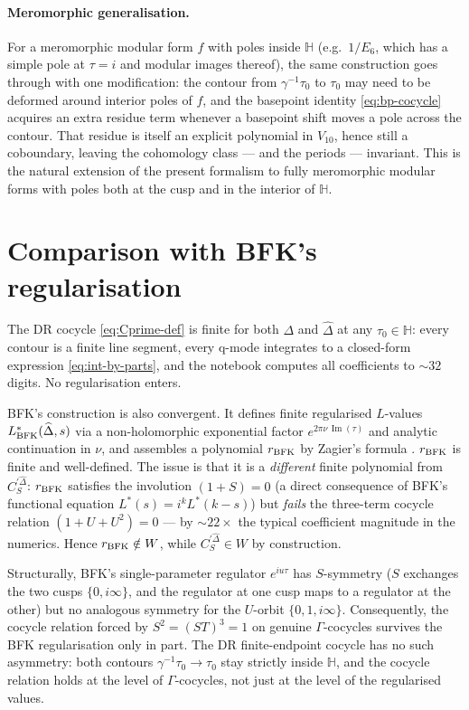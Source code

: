 \documentclass[11pt,letterpaper]{article}
\newcommand{\HH}{\mathbb{H}}
\newcommand{\Dhat}{\widehat{\Delta}}
\DeclareMathOperator{\im}{Im}
\begin{document}
\paragraph{Meromorphic generalisation.}
For a meromorphic modular form $f$ with poles inside $\HH$ (e.g.\ $1/E_6$,
which has a simple pole at $\tau = i$ and modular images thereof), the same
construction goes through with one modification: the contour from
$\gamma^{-1}\tau_0$ to $\tau_0$ may need to be deformed around interior poles
of $f$, and the basepoint identity \eqref{eq:bp-cocycle} acquires an
extra residue term whenever a basepoint shift moves a pole across the contour.
That residue is itself an explicit polynomial in $V_{10}$, hence still a
coboundary, leaving the cohomology class — and the periods — invariant.  This
is the natural extension of the present formalism to fully meromorphic
modular forms with poles both at the cusp and in the interior of $\HH$.

\section{Comparison with BFK's regularisation}\label{sec:bfk-comparison}

The DR cocycle \eqref{eq:Cprime-def} is finite for both $\Delta$ and $\Dhat$
at any $\tau_0 \in \HH$: every contour is a finite line segment, every q-mode
integrates to a closed-form expression \eqref{eq:int-by-parts}, and the
notebook computes all coefficients to $\sim 32$ digits.  No regularisation
enters.

BFK's construction is also convergent.  It defines finite regularised
$L$-values $L^*_{\rm BFK}(\Dhat, s)$ via a non-holomorphic exponential factor
$e^{2\pi\nu\,\im(\tau)}$ and analytic continuation in $\nu$, and assembles a
polynomial $r_{\rm BFK}$ by Zagier's formula \cite{BFK2011}.  $r_{\rm BFK}$ is
finite and well-defined.  The issue is that it is a \emph{different} finite
polynomial from $C^{\prime\Dhat}_S$: $r_{\rm BFK}$ satisfies the involution
$(1+S) = 0$ (a direct consequence of BFK's functional equation $L^*(s) =
i^k L^*(k-s)$) but \emph{fails} the three-term cocycle relation
$(1+U+U^2) = 0$ — by $\sim 22\times$ the typical coefficient magnitude in the
numerics.  Hence $r_{\rm BFK} \notin W$, while $C^{\prime\Dhat}_S \in W$ by
construction.

Structurally, BFK's single-parameter regulator $e^{iu\tau}$ has $S$-symmetry
($S$ exchanges the two cusps $\{0, i\infty\}$, and the regulator at one cusp
maps to a regulator at the other) but no analogous symmetry for the $U$-orbit
$\{0, 1, i\infty\}$.  Consequently, the cocycle relation forced by $S^2 =
(ST)^3 = 1$ on genuine $\Gamma$-cocycles survives the BFK regularisation only
in part.  The DR finite-endpoint cocycle has no such asymmetry: both contours
$\gamma^{-1}\tau_0 \to \tau_0$ stay strictly inside $\HH$, and the cocycle
relation holds at the level of $\Gamma$-cocycles, not just at the level of
the regularised values.
\end{document}
